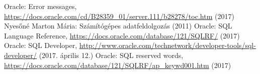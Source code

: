 

\begin{thebibliography}{}

Oracle: Error messages, \url{https://docs.oracle.com/cd/B28359_01/server.111/b28278/toc.htm} (2017)
Nyesőné Marton Mária: Számítógépes adatfeldolgozás (2011)
Oracle: SQL Language Reference, \url{https://docs.oracle.com/database/121/SQLRF/} (2017)
Oracle: SQL Developer, \url{http://www.oracle.com/technetwork/developer-tools/sql-developer/} (2017. április 12.)
Oracle: SQL reserved words, \url{https://docs.oracle.com/database/121/SQLRF/ap_keywd001.htm} (2017)

\end{thebibliography}